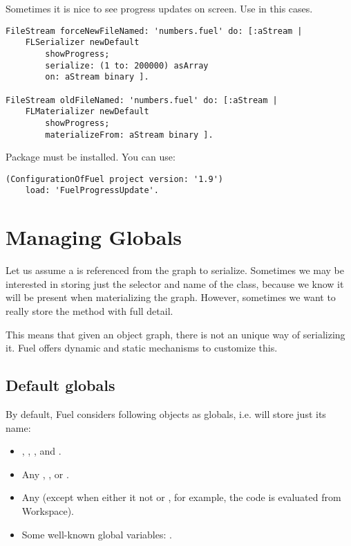 \documentclass[a4paper,10pt,twoside]{book}
\begin{document}
Sometimes it is nice to see progress updates on screen. Use  in this cases.

\begin{lstlisting}
FileStream forceNewFileNamed: 'numbers.fuel' do: [:aStream |
	FLSerializer newDefault 
		showProgress;
		serialize: (1 to: 200000) asArray 
		on: aStream binary ].
	
FileStream oldFileNamed: 'numbers.fuel' do: [:aStream | 
	FLMaterializer newDefault 
		showProgress;
		materializeFrom: aStream binary ].
\end{lstlisting}

Package  must be installed. You can use:

\begin{lstlisting}
(ConfigurationOfFuel project version: '1.9') 
	load: 'FuelProgressUpdate'.
\end{lstlisting}



\section{Managing Globals}
\label{ManagingGlobals}

Let us assume a  is referenced from the graph to serialize. Sometimes we may be interested in storing just the selector and name of the class, because we know it will be present when materializing the graph. However, sometimes we want to really store the method with full detail.

This means that given an object graph, there is not an unique way of serializing it. Fuel offers dynamic and static mechanisms to customize this.

\subsection{Default globals}

By default, Fuel considers following objects as globals, i.e. will store just its name:

\begin{itemize}
\item  {}, , , and .
\item  Any , ,  or .
\item  Any  (except when either it  not or , for example, the code is evaluated from Workspace).
\item  Some well-known global variables:              .
\end{itemize}
\end{document}
